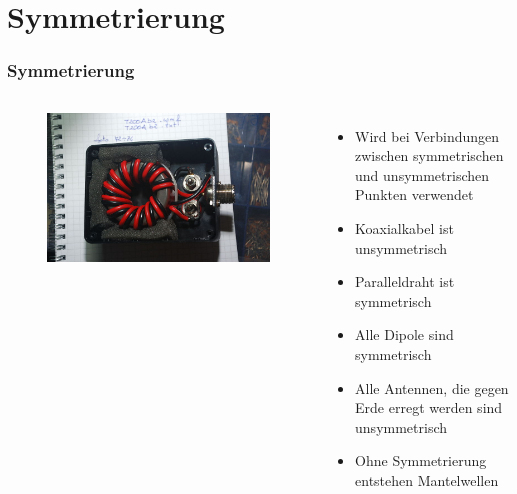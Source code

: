 \section*{Symmetrierung}
\begin{frame}
  \frametitle{Symmetrierung}
  \begin{columns}
    \begin{figure}
      \includegraphics[width=\textwidth,height=.8\textheight,keepaspectratio]{a10/balun.jpg}
    \end{figure}
    \begin{itemize}
      \item Wird bei Verbindungen zwischen symmetrischen und unsymmetrischen Punkten verwendet
      \item Koaxialkabel ist unsymmetrisch
      \item Paralleldraht ist symmetrisch
      \item Alle Dipole sind symmetrisch
      \item Alle Antennen, die gegen Erde erregt werden sind unsymmetrisch
      \item Ohne Symmetrierung entstehen Mantelwellen
    \end{itemize}
  \end{columns}
\end{frame}

